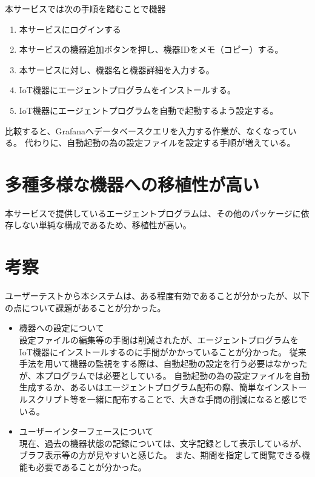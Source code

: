 本サービスでは次の手順を踏むことで機器
\begin{enumerate}
\item 本サービスにログインする
\item 本サービスの機器追加ボタンを押し、機器IDをメモ（コピー）する。
\item 本サービスに対し、機器名と機器詳細を入力する。
\item IoT機器にエージェントプログラムをインストールする。
\item IoT機器にエージェントプログラムを自動で起動するよう設定する。
\end{enumerate}

比較すると、Grafanaへデータベースクエリを入力する作業が、なくなっている。
代わりに、自動起動の為の設定ファイルを設定する手順が増えている。

\section{多種多様な機器への移植性が高い}
本サービスで提供しているエージェントプログラムは、その他のパッケージに依存しない単純な構成であるため、移植性が高い。


\section{考察}
ユーザーテストから本システムは、ある程度有効であることが分かったが、以下の点について課題があることが分かった。
\begin{itemize}
\item 機器への設定について\\
	設定ファイルの編集等の手間は削減されたが、エージェントプログラムをIoT機器にインストールするのに手間がかかっていることが分かった。
	従来手法を用いて機器の監視をする際は、自動起動の設定を行う必要はなかったが、本プログラムでは必要としている。
	自動起動の為の設定ファイルを自動生成するか、あるいはエージェントプログラム配布の際、簡単なインストールスクリプト等を一緒に配布することで、大きな手間の削減になると感じでいる。
\item ユーザーインターフェースについて\\
	現在、過去の機器状態の記録については、文字記録として表示しているが、ブラフ表示等の方が見やすいと感じた。
	また、期間を指定して閲覧できる機能も必要であることが分かった。
\end{itemize}


